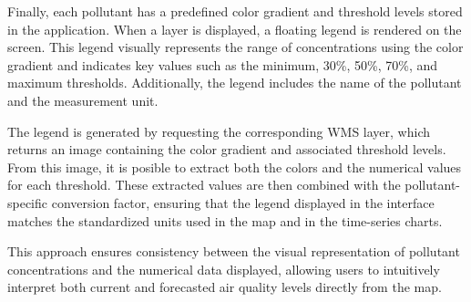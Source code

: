 Finally, each pollutant has a predefined color gradient and threshold levels stored in the application. When a layer is displayed, a floating legend is rendered on the screen. This legend visually represents the range of concentrations using the color gradient and indicates key values such as the minimum, 30\%, 50\%, 70\%, and maximum thresholds. Additionally, the legend includes the name of the pollutant and the measurement unit.

The legend is generated by requesting the corresponding WMS layer, which returns an image containing the color gradient and associated threshold levels. From this image, it is posible to extract both the colors and the numerical values for each threshold. These extracted values are then combined with the pollutant-specific conversion factor, ensuring that the legend displayed in the interface matches the standardized units used in the map and in the time-series charts.

This approach ensures consistency between the visual representation of pollutant concentrations and the numerical data displayed, allowing users to intuitively interpret both current and forecasted air quality levels directly from the map.